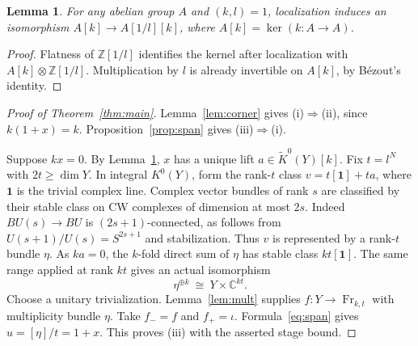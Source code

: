 \documentclass[11pt]{article}
\newtheorem{lemma}[theorem]{Lemma}
\DeclareMathOperator{\Fr}{Fr}
\newcommand{\Z}{\mathbb Z}
\newcommand{\C}{\mathbb C}
\newcommand{\triv}{\mathbf 1}
\begin{document}
\begin{lemma}\label{lem:torsion}
For any abelian group \(A\) and \((k,l)=1\), localization induces an isomorphism \(A[k]\to A[1/l][k]\), where \(A[k]=\ker(k:A\to A)\).
\end{lemma}
\begin{proof}
Flatness of \(\Z[1/l]\) identifies the kernel after localization with \(A[k]\otimes\Z[1/l]\). Multiplication by \(l\) is already invertible on \(A[k]\), by B\'ezout's identity.
\end{proof}

\begin{proof}[Proof of Theorem~\ref{thm:main}]
Lemma~\ref{lem:corner} gives \textup{(i)}\(\Rightarrow\)\textup{(ii)}, since \(k(1+x)=k\). Proposition~\ref{prop:span} gives \textup{(iii)}\(\Rightarrow\)\textup{(i)}.

Suppose \(kx=0\). By Lemma~\ref{lem:torsion}, \(x\) has a unique lift \(a\in\widetilde K^0(Y)[k]\). Fix \(t=l^N\) with \(2t\geq\dim Y\). In integral \(K^0(Y)\), form the rank-\(t\) class \(v=t[\triv]+t a\), where \(\triv\) is the trivial complex line. Complex vector bundles of rank \(s\) are classified by their stable class on CW complexes of dimension at most \(2s\). Indeed \(BU(s)\to BU\) is \((2s+1)\)-connected, as follows from \(U(s+1)/U(s)=S^{2s+1}\) and stabilization. Thus \(v\) is represented by a rank-\(t\) bundle \(\eta\). As \(ka=0\), the \(k\)-fold direct sum of \(\eta\) has stable class \(kt[\triv]\). The same range applied at rank \(kt\) gives an actual isomorphism
\[
                    \eta^{\oplus k}\ \cong\ Y\times\C^{kt}.
\]
Choose a unitary trivialization. Lemma~\ref{lem:mult} supplies \(f:Y\to\Fr_{k,t}\) with multiplicity bundle \(\eta\). Take \(f_- = f\) and \(f_+=\iota\). Formula~\eqref{eq:span} gives \(u=[\eta]/t=1+x\). This proves \textup{(iii)} with the asserted stage bound.
\end{proof}
\end{document}
